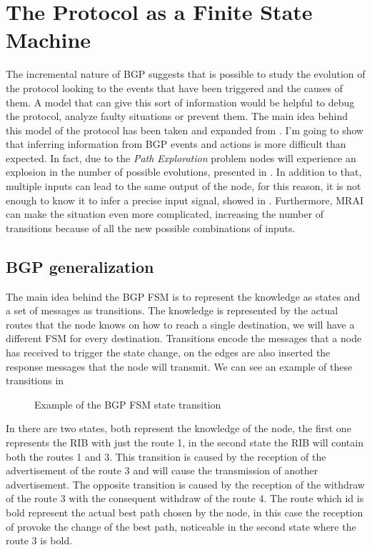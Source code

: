 \chapter{The Protocol as a Finite State Machine}
\label{cha:bgp_fsm}

The incremental nature of \ac{BGP} suggests that is possible to study the
evolution of the protocol looking to the events that have been triggered
and the causes of them.
A model that can give this sort of information would be helpful to debug
the protocol, analyze faulty situations or prevent them.
The main idea behind this model of the protocol has been taken and
expanded from \cite{griffinFSM}.
I'm going to show that inferring information from \ac{BGP} events and actions
is more difficult than expected.
In fact, due to the \textit{Path Exploration} problem
nodes will experience an explosion in the number of possible evolutions,
presented in .
In addition to that, multiple inputs can lead to the same output of the node,
for this reason, it is not enough to know it to infer a precise input signal,
showed in .
Furthermore, \ac{MRAI} can make the situation even more complicated, increasing
the number of transitions because of all the new possible combinations of
inputs.

\section{BGP generalization}
\label{sec:bgp_generalization}

The main idea behind the \ac{BGP} \ac{FSM} is to represent the knowledge as
states and a set of messages as transitions.
The knowledge is represented by the actual routes that the node knows on how
to reach a single destination, we will have a different \ac{FSM} for every
destination.
Transitions encode the messages that a node has received to trigger the state change,
on the edges are also inserted the response messages that the node will transmit.
We can see an example of these transitions in 

\begin{figure}[h]
    \begin{center}
        
    \end{center}
	\caption{Example of the \ac{BGP} \ac{FSM} state transition}
    \label{fig:fsm_example}
\end{figure}

In  there are two states, both represent the knowledge of
the node, the first one represents the \ac{RIB} with just the route \num{1}, in
the second state the \ac{RIB} will contain both the routes \num{1} and \num{3}.
This transition is caused by the reception of the advertisement of the route
\num{3} and will cause the transmission of another advertisement.
The opposite transition is caused by the reception of the withdraw of the route
\num{3} with the consequent withdraw of the route \num{4}.
The route which id is bold represent the actual best path chosen by the node, in
this case the reception of  provoke the change of the best path, noticeable
in the second state where the route \num{3} is bold.

